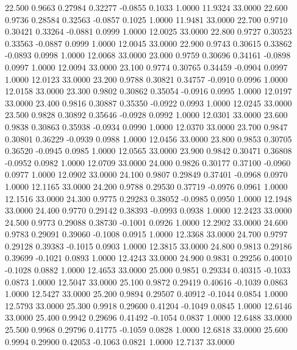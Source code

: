   22.500   0.9663   0.27984   0.32277  -0.0855   0.1033   1.0000  11.9324  33.0000
  22.600   0.9736   0.28584   0.32563  -0.0857   0.1025   1.0000  11.9481  33.0000
  22.700   0.9710   0.30421   0.33264  -0.0881   0.0999   1.0000  12.0025  33.0000
  22.800   0.9727   0.30523   0.33563  -0.0887   0.0999   1.0000  12.0045  33.0000
  22.900   0.9743   0.30615   0.33862  -0.0893   0.0998   1.0000  12.0068  33.0000
  23.000   0.9759   0.30696   0.34161  -0.0898   0.0997   1.0000  12.0094  33.0000
  23.100   0.9774   0.30765   0.34459  -0.0904   0.0997   1.0000  12.0123  33.0000
  23.200   0.9788   0.30821   0.34757  -0.0910   0.0996   1.0000  12.0158  33.0000
  23.300   0.9802   0.30862   0.35054  -0.0916   0.0995   1.0000  12.0197  33.0000
  23.400   0.9816   0.30887   0.35350  -0.0922   0.0993   1.0000  12.0245  33.0000
  23.500   0.9828   0.30892   0.35646  -0.0928   0.0992   1.0000  12.0301  33.0000
  23.600   0.9838   0.30863   0.35938  -0.0934   0.0990   1.0000  12.0370  33.0000
  23.700   0.9847   0.30801   0.36229  -0.0939   0.0988   1.0000  12.0456  33.0000
  23.800   0.9853   0.30705   0.36520  -0.0945   0.0985   1.0000  12.0565  33.0000
  23.900   0.9842   0.30471   0.36808  -0.0952   0.0982   1.0000  12.0709  33.0000
  24.000   0.9826   0.30177   0.37100  -0.0960   0.0977   1.0000  12.0902  33.0000
  24.100   0.9807   0.29849   0.37401  -0.0968   0.0970   1.0000  12.1165  33.0000
  24.200   0.9788   0.29530   0.37719  -0.0976   0.0961   1.0000  12.1516  33.0000
  24.300   0.9775   0.29283   0.38052  -0.0985   0.0950   1.0000  12.1948  33.0000
  24.400   0.9770   0.29142   0.38393  -0.0993   0.0938   1.0000  12.2423  33.0000
  24.500   0.9773   0.29088   0.38730  -0.1001   0.0926   1.0000  12.2902  33.0000
  24.600   0.9783   0.29091   0.39060  -0.1008   0.0915   1.0000  12.3368  33.0000
  24.700   0.9797   0.29128   0.39383  -0.1015   0.0903   1.0000  12.3815  33.0000
  24.800   0.9813   0.29186   0.39699  -0.1021   0.0893   1.0000  12.4243  33.0000
  24.900   0.9831   0.29256   0.40010  -0.1028   0.0882   1.0000  12.4653  33.0000
  25.000   0.9851   0.29334   0.40315  -0.1033   0.0873   1.0000  12.5047  33.0000
  25.100   0.9872   0.29419   0.40616  -0.1039   0.0863   1.0000  12.5427  33.0000
  25.200   0.9894   0.29507   0.40912  -0.1044   0.0854   1.0000  12.5793  33.0000
  25.300   0.9918   0.29600   0.41204  -0.1049   0.0845   1.0000  12.6146  33.0000
  25.400   0.9942   0.29696   0.41492  -0.1054   0.0837   1.0000  12.6488  33.0000
  25.500   0.9968   0.29796   0.41775  -0.1059   0.0828   1.0000  12.6818  33.0000
  25.600   0.9994   0.29900   0.42053  -0.1063   0.0821   1.0000  12.7137  33.0000
